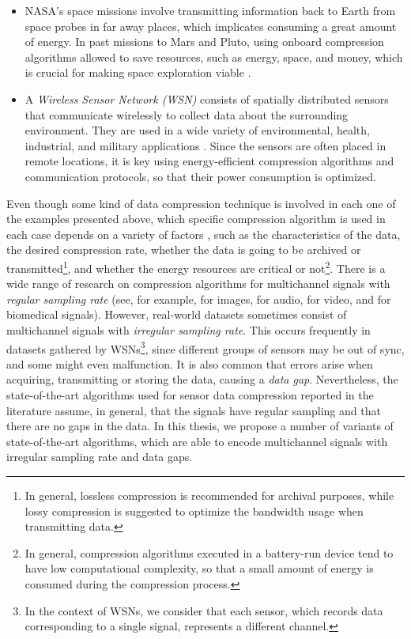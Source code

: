 \begin{itemize}
\item NASA's space missions involve transmitting information back to Earth from space probes in far away places, which implicates consuming a great amount of energy. In past missions to Mars and Pluto, using onboard compression algorithms allowed to save resources, such as energy, space, and money, which is crucial for making space exploration viable \cite{HPMars, Pluto}.

\item A \textit{Wireless Sensor Network (WSN)} consists of spatially distributed sensors that communicate wirelessly to collect data about the surrounding environment. They are used in a wide variety of environmental, health, industrial, and military applications \cite{WSNWiley, WSNList}. Since the sensors are often placed in remote locations, it is key using energy-efficient compression algorithms and communication protocols, so that their power consumption is optimized.
\end{itemize}


\newcommand{\footExampleOne}{\footnote{In general, lossless compression is recommended for archival purposes, while lossy compression is suggested to optimize the bandwidth usage when transmitting data.}}
\newcommand{\footExampleTwo}{\footnote{In general, compression algorithms executed in a battery-run device tend to have low computational complexity, so that a small amount of energy is consumed during the compression process.}}
\newcommand{\footSampling}{\footnote{In the context of WSNs, we consider that each sensor, which records data corresponding to a single signal, represents a different channel.}}


Even though some kind of data compression technique is involved in each one of the examples presented above, which specific compression algorithm is used in each case depends on a variety of factors \cite{DCTSurvey}, such as the characteristics of the data, the desired compression rate, whether the data is going to be archived or transmitted\footExampleOne, and whether the energy resources are critical or not\footExampleTwo. There is a wide range of research on compression algorithms for multichannel signals with \textit{regular sampling rate} (see, for example, \cite{ImageOne, ImageTwo} for images, \cite{AudioOne, AudioTwo} for audio, \cite{VideoOne, VideoTwo} for video, and \cite{MedicalOne, MedicalTwo} for biomedical signals). However, real-world datasets sometimes consist of multichannel signals with \textit{irregular sampling rate}. This occurs frequently in datasets gathered by WSNs\footSampling, since different groups of sensors may be out of sync, and some might even malfunction. It is also common that errors arise when acquiring, transmitting or storing the data, causing a \textit{data gap}. Nevertheless, the state-of-the-art algorithms used for sensor data compression reported in the literature \cite{AnEva2013, Signal2016} assume, in general, that the signals have regular sampling and that there are no gaps in the data. In this thesis, we propose a number of variants of state-of-the-art algorithms, which are able to encode multichannel signals with irregular sampling rate and data gaps. 


